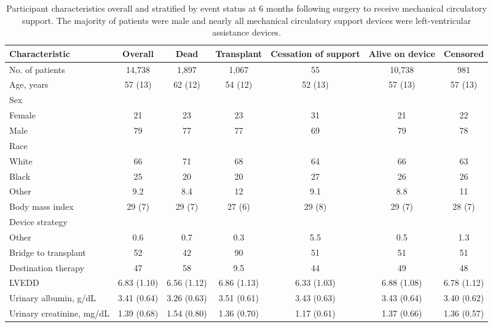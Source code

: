 \documentclass{article}
\begin{document}
\clearpage
\begin{table}
\footnotesize
\caption{Participant characteristics overall and stratified by event status at 6 months following surgery to receive mechanical circulatory support. The majority of patients were male and nearly all mechanical circulatory support devices were left-ventricular assistance devices.}
\label{tbl_characteristics}


\begin{tabular}{lcccccc}
\toprule
Characteristic & Overall & Dead & Transplant & Cessation of support & Alive on device & Censored\\
\midrule
No. of patients & 14,738 & 1,897 & 1,067 & 55 & 10,738 & 981\\
Age, years & 57 (13) & 62 (12) & 54 (12) & 52 (13) & 57 (13) & 57 (13)\\
Sex &  &  &  &  &  & \\
\hspace{1em}Female & 21 & 23 & 23 & 31 & 21 & 22\\
\hspace{1em}Male & 79 & 77 & 77 & 69 & 79 & 78\\
\addlinespace
Race &  &  &  &  &  & \\
\hspace{1em}White & 66 & 71 & 68 & 64 & 66 & 63\\
\hspace{1em}Black & 25 & 20 & 20 & 27 & 26 & 26\\
\hspace{1em}Other & 9.2 & 8.4 & 12 & 9.1 & 8.8 & 11\\
Body mass index & 29 (7) & 29 (7) & 27 (6) & 29 (8) & 29 (7) & 28 (7)\\
\addlinespace
Device strategy &  &  &  &  &  & \\
\hspace{1em}Other & 0.6 & 0.7 & 0.3 & 5.5 & 0.5 & 1.3\\
\hspace{1em}Bridge to transplant & 52 & 42 & 90 & 51 & 51 & 51\\
\hspace{1em}Destination therapy & 47 & 58 & 9.5 & 44 & 49 & 48\\
LVEDD & 6.83 (1.10) & 6.56 (1.12) & 6.86 (1.13) & 6.33 (1.03) & 6.88 (1.08) & 6.78 (1.12)\\
\addlinespace
Urinary albumin, g/dL & 3.41 (0.64) & 3.26 (0.63) & 3.51 (0.61) & 3.43 (0.63) & 3.43 (0.64) & 3.40 (0.62)\\
Urinary creatinine, mg/dL & 1.39 (0.68) & 1.54 (0.80) & 1.36 (0.70) & 1.17 (0.61) & 1.37 (0.66) & 1.36 (0.57)\\

\end{tabular}
\end{table}
\end{document}
